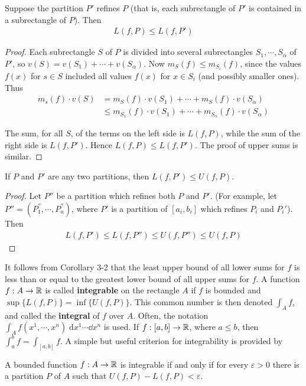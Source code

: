 \begin{lemma}
    Suppose the partition $P'$ refines $P$ (that is, each subrectangle of $P'$
    is contained in a subrectangle of $P$). Then 
    \begin{align*}
        L(f, P) \le L(f, P')
    \end{align*}
    \label{lemma3-1}
\end{lemma}

\begin{proof}
    Each subrectangle $S$ of $P$ is divided into several subrectangles $S_1, \cdots, S_\alpha$ of 
    $P'$, so $v(S) = v(S_1) + \cdots +v(S_\alpha)$. Now $m_S(f)\le m_{S_i}(f)$, since the values 
    $f(x)$ for $s\in S$ included all values $f(x)$ for $x\in S_i$ (and possibly smaller ones).
    Thus 
    \begin{align*}
        m_s(f)\cdot v(S) 
        & = m_S(f)\cdot v(S_1) + \cdots + m_S(f)\cdot v(S_\alpha)\\
        & \le m_{S_1}(f)\cdot v(S_1) + \cdots + m_{S_\alpha}(f)\cdot v(S_\alpha)
    \end{align*}

    The sum, for all $S$, of the terms on the left side is $L(f, P)$, while 
    the sum of the right side is $L(f, P')$. Hence $L(f, P)\le L(f, P')$. The 
    proof of upper sums is similar. 
\end{proof}


\begin{corollary}
    If $P$ and $P'$ are any two partitions, then $L(f,P') \le U(f,P)$.
    \label{corollary3-2}
\end{corollary}

\begin{proof}
    Let $P''$ be a partition which refines both $P$ and $P'$.
    (For example, let $P'' = (P_1^{''}, \cdots, P_n^{''})$, where $P'$ is a 
    partition of $[a_i, b_i]$ which refines $P_i$ and $P_i'$). Then 
    \begin{align*}
        L(f, P') \le L(f, P'') \le U(f, P'') \le U(f, P)
    \end{align*}
\end{proof}

It follows from Corollary 3-2 that the least upper bound of
all lower sums for $f$ is less than or equal to the greatest lower
bound of all upper sums for $f$. A function $f:A \to \mathbb{R}$ is called \textbf{integrable} 
on the rectangle $A$ if $f$ is bounded and $\sup\{L(f,P)\} = \inf \{U(f, P)\}$. 
This common number is then denoted $\int_{A }^{}{f}$, and called the \textbf{integral} of 
$f$ over $A$. Often, the notation $\int_{A  }^{}{f(x^1, \cdots, x^n)  \;\mathrm{d}x^1\cdots \dd x^n}$ 
is used. If $f:[a, b]\to \mathbb{R}$, where $a\le b$, then $\int_{a  }^{b }{f} = \int_{[a, b ]}^{}{f}$.
A simple but useful criterion for integrability is provided by 
\begin{theorem}
    A bounded function $f:A\to \mathbb{R}$ is integrable if and only if for every $\varepsilon>0$ 
    there is a partition $P$ of $A$ such that $U(f, P) - L(f, P)< \varepsilon$.
\end{theorem}

